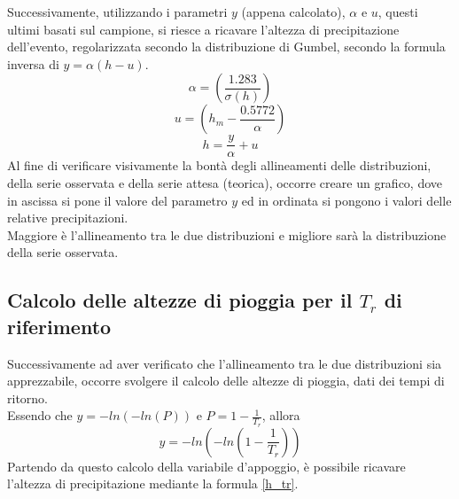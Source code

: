 Successivamente, utilizzando i parametri $y$ (appena calcolato), $\alpha$ e $u$, questi ultimi basati sul campione, si riesce a ricavare l'altezza di precipitazione dell'evento, regolarizzata secondo la distribuzione di Gumbel, secondo la formula inversa di $y = \alpha (h - u)$.\\
\begin{equation}
    \alpha = \left(\frac{1.283}{\sigma(h)}\right)
\end{equation}
\begin{equation}
    u = \left( h_m - \frac{0.5772}{\alpha} \right)
\end{equation}
\begin{equation}
    h = \frac{y}{\alpha}+u
    \label{h_tr}
\end{equation}
Al fine di verificare visivamente la bontà degli allineamenti delle distribuzioni, della serie osservata e della serie attesa (teorica), occorre creare un grafico, dove in ascissa si pone il valore del parametro $y$ ed in ordinata si pongono i valori delle relative precipitazioni.\\
Maggiore è l'allineamento tra le due distribuzioni e migliore sarà la distribuzione della serie osservata.

\subsection{Calcolo delle altezze di pioggia per il $T_r$ di riferimento}
Successivamente ad aver verificato che l'allineamento tra le due distribuzioni sia apprezzabile, occorre svolgere il calcolo delle altezze di pioggia, dati dei tempi di ritorno.\\
Essendo che $y = -ln(-ln(P))$ e $P = 1-\frac{1}{T_r}$, allora 
\begin{equation}
y = -ln(-ln(1-\frac{1}{T_r}))
\end{equation}
Partendo da questo calcolo della variabile d'appoggio, è possibile ricavare l'altezza di precipitazione mediante la formula \ref{h_tr}.


